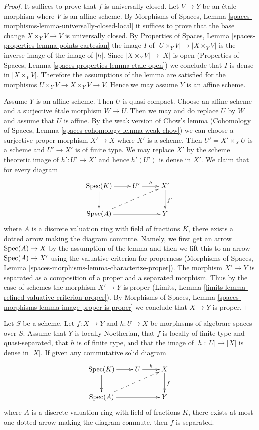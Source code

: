 \begin{proof}
It suffices to prove that $f$ is universally closed.
Let $V \to Y$ be an \'etale morphism where $V$ is an affine scheme.
By Morphisms of Spaces, Lemma
\ref{spaces-morphisms-lemma-universally-closed-local}
it suffices to prove that the base change $X \times_Y V \to V$ is
universally closed. By Properties of Spaces, Lemma
\ref{spaces-properties-lemma-points-cartesian}
the image $I$ of $|U \times_Y V| \to |X \times_Y V|$
is the inverse image of the image of $|h|$. Since
$|X \times_Y V| \to |X|$ is open
(Properties of Spaces, Lemma \ref{spaces-properties-lemma-etale-open})
we conclude that $I$ is dense in $|X \times_Y V|$.
Therefore the assumptions of the lemma are
satisfied for the morphisms $U \times_Y V \to X \times_Y V \to V$.
Hence we may assume $Y$ is an affine scheme.

\medskip\noindent
Assume $Y$ is an affine scheme. Then $U$ is quasi-compact. Choose
an affine scheme and a surjective \'etale morphism $W \to U$.
Then we may and do replace $U$ by $W$ and assume that $U$ is affine.
By the weak version of Chow's lemma
(Cohomology of Spaces, Lemma \ref{spaces-cohomology-lemma-weak-chow})
we can choose a surjective proper morphism $X' \to X$
where $X'$ is a scheme. Then $U' = X' \times_X U$ is a scheme
and $U' \to X'$ is of finite type. We may replace $X'$ by
the scheme theoretic image of $h' : U' \to X'$ and hence $h'(U')$
is dense in $X'$. We claim that for every diagram
$$
\xymatrix{
\Spec(K) \ar[r] \ar[d] & U' \ar[r]^h & X' \ar[d]^{f'} \\
\Spec(A) \ar[rr] \ar@{-->}[rru] & & Y
}
$$
where $A$ is a discrete valuation ring with field of fractions $K$, there
exists a dotted arrow making the diagram commute. Namely, we first get an
arrow $\mathop{\mathrm{Spec}}(A) \to X$ by the assumption of the lemma and then we lift this
to an arrow $\mathop{\mathrm{Spec}}(A) \to X'$ using the valuative criterion for properness
(Morphisms of Spaces, Lemma \ref{spaces-morphisms-lemma-characterize-proper}).
The morphism $X' \to Y$ is separated
as a composition of a proper and a separated morphism.
Thus by the case of schemes the morphism $X' \to Y$ is proper
(Limits, Lemma
\ref{limits-lemma-refined-valuative-criterion-proper}).
By Morphisms of Spaces, Lemma
\ref{spaces-morphisms-lemma-image-proper-is-proper}
we conclude that $X \to Y$ is proper.
\end{proof}

\begin{lemma}
\label{lemma-refined-valuative-criterion-separated}
Let $S$ be a scheme. Let $f : X \to Y$ and $h : U \to X$ be
morphisms of algebraic spaces over $S$. Assume that $Y$ is
locally Noetherian, that $f$ is locally of finite type and quasi-separated,
that $h$ is of finite type, and that the image of $|h| : |U| \to |X|$
is dense in $|X|$.
If given any commutative solid diagram
$$
\xymatrix{
\Spec(K) \ar[r] \ar[d] & U \ar[r]^h & X \ar[d]^f \\
\Spec(A) \ar[rr] \ar@{-->}[rru] & & Y
}
$$
where $A$ is a discrete valuation ring with field of fractions $K$, there
exists at most one dotted arrow making the diagram commute, then $f$ is
separated.
\end{lemma}


